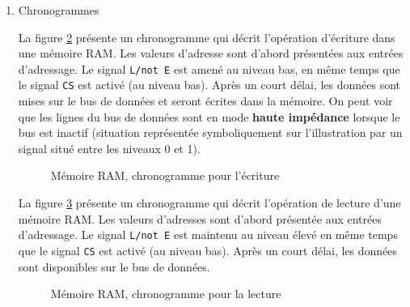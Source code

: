 \documentclass[letter, oneside]{book}
\begin{document}
\begin{enumerate}
Pour acheminer les données lues ou à écrire dans la mémoire, on
utilise des tampons émetteurs-récepteurs de bus (voir section \ref{sec:orgc0c5d7b}), organisés en vecteur, pour créer un
\textbf{bus de données} qui permet un aller-retour des données, selon le sens
de l'action. Cela permet de diminuer de moitié le nombre de connexions
nécessaires pour l'échange des données.  Un signal dérivé des signaux
\texttt{Lecture/écriture} et \texttt{Chip select (CS)} est typiquement utilisé pour
commander l'entrée de contrôle (voir figure \ref{fig:org627390c}).

\begin{figure}[htbp]
\centering

\caption{\label{fig:org627390c}Bus de données, 8 bits}
\end{figure}

\item Chronogrammes
\label{sec:org8e6baf9}

La figure \ref{fig:orgf5375e6} présente un chronogramme qui décrit
l'opération d'écriture dans une mémoire RAM. Les valeurs d'adresse
sont d'abord présentées aux entrées d'adressage.  Le signal \texttt{L/not E}
est amené au niveau bas, en même temps que le signal \texttt{CS} est activé
(au niveau bas). Après un court délai, les données sont mises sur le
bus de données et seront écrites dans la mémoire. On peut voir que les
lignes du bus de données sont en mode \textbf{haute impédance} lorsque le bus
est inactif (situation représentée symboliquement sur l'illustration
par un signal situé entre les niveaux 0 et 1).

\begin{figure}[htbp]
\centering

\caption{\label{fig:orgf5375e6}Mémoire RAM, chronogramme pour l'écriture}
\end{figure}

La figure \ref{fig:org881cb54} présente un chronogramme qui décrit
l'opération de lecture d'une mémoire RAM. Les valeurs d'adresses sont
d'abord présentée aux entrées d'adressage.  Le signal \texttt{L/not E} est
maintenu au niveau élevé en même temps que le signal \texttt{CS} est activé
(au niveau bas). Après un court délai, les données sont disponibles sur
le bus de données.

\begin{figure}[htbp]
\centering

\caption{\label{fig:org881cb54}Mémoire RAM, chronogramme pour la lecture}
\end{figure}


\end{enumerate}
\end{document}

